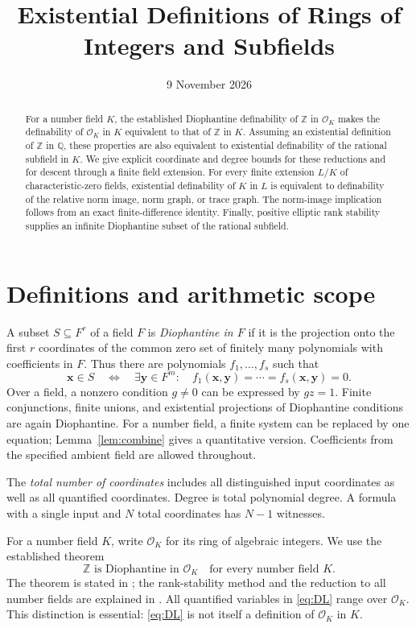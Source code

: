 \documentclass[11pt,a4paper]{article}
\title{Existential Definitions of Rings of Integers and Subfields}
\author{}
\date{9 November 2026}
\theoremstyle{definition}
\newcommand{\Q}{\mathbb Q}
\newcommand{\Z}{\mathbb Z}
\newcommand{\OK}{\mathcal O_K}
\begin{document}
\maketitle
\begin{abstract}
For a number field $K$, the established Diophantine definability of
$\Z$ in $\mathcal O_K$ makes the definability of $\mathcal O_K$ in
$K$ equivalent to that of $\Z$ in $K$. Assuming an existential
definition of $\Z$ in $\Q$, these properties are also equivalent to
existential definability of the rational subfield in $K$.
We give explicit coordinate and degree bounds for these reductions
and for descent through a finite field extension. For every finite
extension $L/K$ of characteristic-zero fields, existential
definability of $K$ in $L$ is equivalent to definability of the
relative norm image, norm graph, or trace graph. The norm-image
implication follows from an exact finite-difference identity.
Finally, positive elliptic rank stability supplies an infinite
Diophantine subset of the rational subfield.
\end{abstract}

\section{Definitions and arithmetic scope}

A subset $S\subseteq F^r$ of a field $F$ is \emph{Diophantine in $F$}
if it is the projection onto the first $r$ coordinates of the common
zero set of finitely many polynomials with coefficients in $F$.
Thus there are polynomials $f_1,\ldots,f_s$ such that
\[
 \mathbf x\in S\quad\Longleftrightarrow\quad
 \exists\mathbf y\in F^m:\quad
 f_1(\mathbf x,\mathbf y)=\cdots=f_s(\mathbf x,\mathbf y)=0.
\]
Over a field, a nonzero condition $g\ne0$ can be expressed by
$gz=1$. Finite conjunctions, finite unions, and existential
projections of Diophantine conditions are again Diophantine.
For a number field, a finite system can be replaced by one equation;
Lemma~\ref{lem:combine} gives a quantitative version. Coefficients
from the specified ambient field are allowed throughout.

The \emph{total number of coordinates} includes all distinguished
input coordinates as well as all quantified coordinates. Degree is
total polynomial degree. A formula with a single input and $N$
total coordinates has $N-1$ witnesses.

For a number field $K$, write $\OK$ for its ring of algebraic
integers. We use the established theorem
\begin{equation}\label{eq:DL}
            \Z\text{ is Diophantine in }\OK
            \quad\text{for every number field }K.
\end{equation}
The theorem is stated in \cite[Corollary 1.2]{ABHS}; the
rank-stability method and the reduction to all number fields are
explained in \cite[Sections 1.2 and 5]{Poonen}.
All quantified variables in \eqref{eq:DL} range over $\OK$.
This distinction is essential: \eqref{eq:DL} is not itself a
definition of $\OK$ in $K$.
\end{document}

